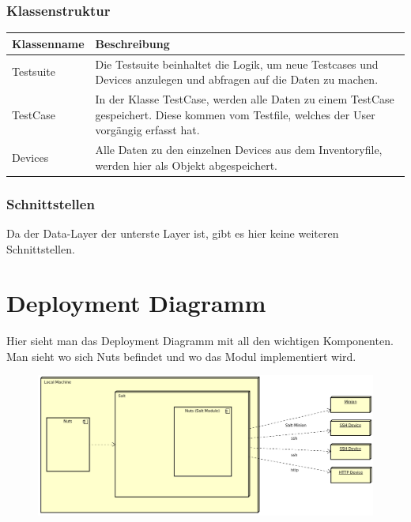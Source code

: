 \documentclass[a4,12pt]{scrartcl}
\begin{document}
\subsubsection{Klassenstruktur}
\begin{table}[H]
\centering
    \begin{tabular}{@{}l p{11cm} @{}}\toprule    
    {Klassenname} & {Beschreibung}\\ \midrule
    
    Testsuite & Die Testsuite beinhaltet die Logik, um neue Testcases und Devices anzulegen und abfragen auf die Daten zu machen.\\     
    TestCase & In der Klasse TestCase, werden alle Daten zu einem TestCase gespeichert. Diese kommen vom Testfile, welches der User vorgängig erfasst hat.\\         
    Devices & Alle Daten zu den einzelnen Devices aus dem Inventoryfile, werden hier als Objekt abgespeichert.\\
  
    \bottomrule
    \end{tabular}
\end{table}
\subsubsection{Schnittstellen}
Da der Data-Layer der unterste Layer ist, gibt es hier keine weiteren Schnittstellen.
\newpage
\section{Deployment Diagramm}
Hier sieht man das Deployment Diagramm mit all den wichtigen Komponenten. Man sieht wo sich Nuts befindet und wo das Modul implementiert wird.
\begin{figure} [H]
	\begin{center}
	\includegraphics[width=1\textwidth]{./pictures/DeploymentDiagram.png}
	\label{Bild Referenz}
	\end{center}
\end{figure}
\end{document}
